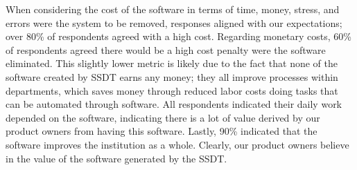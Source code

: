 When considering the cost of the software in terms of time, money, stress, and errors were the system to be removed, responses aligned with our expectations; over 80\% of respondents agreed with a high cost. Regarding monetary costs, 60\% of respondents agreed there would be a high cost penalty were the software eliminated. This slightly lower metric is likely due to the fact that none of the software created by SSDT earns any money; they all improve processes within departments, which saves money through reduced labor costs doing tasks that can be automated through software. All respondents indicated their daily work depended on the software, indicating there is a lot of value derived by our product owners from having this software. Lastly, 90\% indicated that the software improves the institution as a whole. Clearly, our product owners believe in the value of the software generated by the SSDT.

